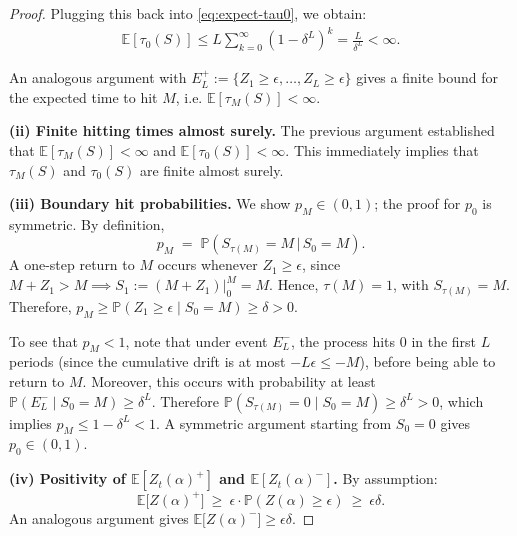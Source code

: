 \documentclass[10pt,a4paper]{amsart}
\theoremstyle{plain}
\theoremstyle{definition}
\theoremstyle{remark}
\newcommand{\pr}{\mathbb{P}}
\renewcommand{\Pr}{\pr}
\newcommand{\Exp}[1]{\mathbb{E} \left[ #1 \right]}
\begin{document}
\begin{proof}
Plugging this back into \eqref{eq:expect-tau0}, we obtain:
\begin{align*}
\mathbb{E}[\tau_0(S)] \leq L\sum_{k=0}^{\infty}(1-\delta^L)^k = \frac{L}{\delta^L} < \infty.
\end{align*}

An analogous argument with $E^+_L := \{Z_1\ge \epsilon,\ldots,Z_L\ge \epsilon\}$ gives a finite bound for the expected time to hit $M$, i.e. $\Exp{\tau_M(S)} < \infty$.


\medskip
\noindent\textbf{(ii) Finite hitting times almost surely.}
The previous argument established that $\Exp{\tau_M(S)} < \infty$ and $\Exp{\tau_0(S)} < \infty$. This immediately implies that $\tau_M(S)$ and $\tau_0(S)$ are finite almost surely.

\medskip
\noindent\textbf{(iii) Boundary hit probabilities.} We show $p_M\in(0,1)$; the proof for $p_0$ is symmetric.
By definition,
\[
p_M \;=\; \Pr(S_{\tau(M)}=M \,\big|\, S_0 = M).
\]
A one-step return to $M$ occurs whenever $Z_1\ge \epsilon$, since $M+Z_1 > M \implies S_1 := (M+Z_1)\vert_0^M=M$. Hence, $\tau(M) = 1$, with $S_{\tau(M)} = M$.
Therefore, $p_M \ge \Pr(Z_1\ge \epsilon\mid S_0=M)\ge \delta>0$.

To see that $p_M<1$, note that under event $E^-_L$, the process hits 0 in the first $L$ periods (since the cumulative drift is at most $-L\epsilon \leq -M$), before being able to return to $M$. Moreover, this occurs with probability at least
$\Pr(E^-_L\mid S_0=M)\ge \delta^L$.
Therefore $\Pr(S_{\tau(M)}=0\mid S_0=M)\ge \delta^L>0$, which implies $p_M\le 1-\delta^L<1$.
A symmetric argument starting from $S_0=0$ gives $p_0\in(0,1)$.

\medskip
\noindent\textbf{(iv) Positivity of $\Exp{Z_t(\alpha)^+}$ and $\Exp{Z_t(\alpha)^-}$.}
By assumption:
\[
\mathbb{E}\big[ Z(\alpha)^+ \big] 
\ \ge\ \epsilon \cdot \Pr(Z(\alpha) \geq \epsilon) 
\ \ge\ \epsilon \delta.
\]
An analogous argument gives $\mathbb{E}\big[ Z(\alpha)^- \big] \ge \epsilon\delta$.  
\end{proof}
\end{document}
